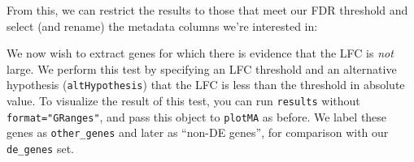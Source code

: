 \documentclass[
]{article}
\newenvironment{Shaded}{}{}
\newcommand{\DataTypeTok}[1]{\textcolor[rgb]{0.56,0.13,0.00}{#1}}
\newcommand{\DecValTok}[1]{\textcolor[rgb]{0.25,0.63,0.44}{#1}}
\newcommand{\FloatTok}[1]{\textcolor[rgb]{0.25,0.63,0.44}{#1}}
\newcommand{\KeywordTok}[1]{\textcolor[rgb]{0.00,0.44,0.13}{\textbf{#1}}}
\newcommand{\NormalTok}[1]{#1}
\newcommand{\OperatorTok}[1]{\textcolor[rgb]{0.40,0.40,0.40}{#1}}
\newcommand{\StringTok}[1]{\textcolor[rgb]{0.25,0.44,0.63}{#1}}
\begin{document}
From this, we can restrict the results to those that meet our FDR threshold and
select (and rename) the metadata columns we're interested in:

\begin{Shaded}
\end{Shaded}

We now wish to extract genes for which there is evidence that the LFC
is \emph{not} large. We perform this test by specifying an LFC threshold
and an alternative hypothesis (\texttt{altHypothesis}) that the LFC is less
than the threshold in absolute value. To visualize the result of this
test, you can run \texttt{results} without \texttt{format="GRanges"}, and pass this
object to \texttt{plotMA} as before. We label these genes as \texttt{other\_genes}
and later as ``non-DE genes'', for comparison with our \texttt{de\_genes} set.

\begin{Shaded}
\end{Shaded}
\end{document}
